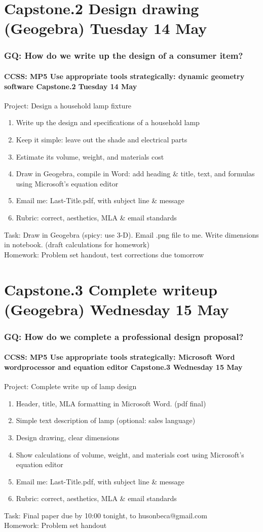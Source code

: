 \documentclass{beamer}
\begin{document}
\section{Capstone.2 Design drawing (Geogebra) Tuesday 14 May}
  \frame
  {
    \frametitle{GQ: How do we write up the design of a consumer item?}
    \framesubtitle{CCSS: MP5 Use appropriate tools strategically: dynamic geometry software \hfill \alert{Capstone.2 Tuesday 14 May}}

    \begin{block}{Project: Design a household lamp fixture}
      \begin{enumerate}
        \item Write up the design and specifications of a household lamp
        \item Keep it simple: leave out the shade and electrical parts
        \item Estimate its volume, weight, and materials cost
        \item Draw in Geogebra, compile in Word: add heading \& title, text, and formulas using Microsoft's equation editor
        \item Email me: Last-Title.pdf, with subject line \& message
        \item Rubric: correct, aesthetics, MLA \& email standards
      \end{enumerate}
    \end{block}
    Task: Draw in Geogebra (spicy: use 3-D). Email .png file to me. Write dimensions in notebook. (draft calculations for homework)\\
    Homework: Problem set handout, test corrections due tomorrow
      }

\section{Capstone.3 Complete writeup (Geogebra) Wednesday 15 May}
  \frame
  {
    \frametitle{GQ: How do we complete a professional design proposal?}
    \framesubtitle{CCSS: MP5 Use appropriate tools strategically: Microsoft Word wordprocessor and equation editor \hfill \alert{Capstone.3 Wednesday 15 May}}

    \begin{block}{Project: Complete write up of lamp design}
      \begin{enumerate}
        \item Header, title, MLA formatting in Microsoft Word. (pdf final)
        \item Simple text description of lamp (optional: sales language)
        \item Design drawing, clear dimensions
        \item Show calculations of volume, weight, and materials cost using Microsoft's equation editor
        \item Email me: Last-Title.pdf, with subject line \& message
        \item Rubric: correct, aesthetics, MLA \& email standards
      \end{enumerate}
    \end{block}
    Task: Final paper due by 10:00 tonight, to husonbeca@gmail.com\\
    Homework: Problem set handout
  }
\end{document}
